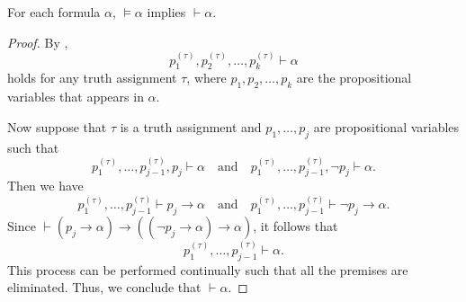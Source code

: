 \begin{theorem}
  For each formula $\alpha$, $\vDash \alpha$ implies $\vdash \alpha$.
\end{theorem}
\begin{proof}
  By ,
  \begin{equation*}
    p_1^{(\tau)}, p_2^{(\tau)}, \dots, p_k^{(\tau)} \vdash \alpha
  \end{equation*}
  holds for any truth assignment $\tau$, where $p_1, p_2, \dots, p_k$ are the
  propositional variables that appears in $\alpha$.

  Now suppose that $\tau$ is a truth assignment and $p_1, \dots, p_j$ are
  propositional variables such that
  \begin{equation*}
    p_1^{(\tau)}, \dots, p_{j-1}^{(\tau)}, p_j \vdash \alpha
    \quad \text{and} \quad
    p_1^{(\tau)}, \dots, p_{j-1}^{(\tau)}, \neg p_j \vdash \alpha.
  \end{equation*}
  Then we have
  \begin{equation*}
    p_1^{(\tau)}, \dots, p_{j-1}^{(\tau)} \vdash p_j \to \alpha
    \quad \text{and} \quad
    p_1^{(\tau)}, \dots, p_{j-1}^{(\tau)} \vdash \neg p_j \to \alpha.
  \end{equation*}
  Since $\vdash (p_j \to \alpha) \to ((\neg p_j \to \alpha) \to \alpha)$,
  it follows that
  \begin{equation*}
    p_1^{(\tau)}, \dots, p_{j-1}^{(\tau)} \vdash \alpha.
  \end{equation*}
  This process can be performed continually such that all the premises are
  eliminated.
  Thus, we conclude that $\vdash \alpha$.
\end{proof}